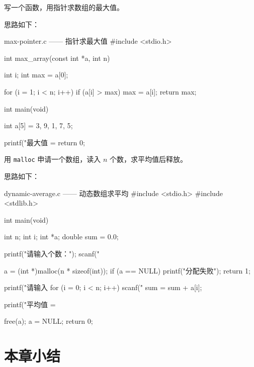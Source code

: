 \begin{example}
写一个函数，用指针求数组的最大值。
\end{example}
\begin{solution}
思路如下：

\begin{codebox}{max-pointer.c —— 指针求最大值}
#include <stdio.h>

int max_array(const int *a, int n)
{
    int i;
    int max = a[0];

    for (i = 1; i < n; i++) {
        if (a[i] > max) {
            max = a[i];
        }
    }
    return max;
}

int main(void)
{
    int a[5] = {3, 9, 1, 7, 5};

    printf("最大值 = %
    return 0;
}
\end{codebox}
\end{solution}

\begin{example}
用 \texttt{malloc} 申请一个数组，读入 $n$ 个数，求平均值后释放。
\end{example}
\begin{solution}
思路如下：

\begin{codebox}{dynamic-average.c —— 动态数组求平均}
#include <stdio.h>
#include <stdlib.h>

int main(void)
{
    int n;
    int i;
    int *a;
    double sum = 0.0;

    printf("请输入个数：");
    scanf("%

    a = (int *)malloc(n * sizeof(int));
    if (a == NULL) {
        printf("分配失败\n");
        return 1;
    }

    printf("请输入 %
    for (i = 0; i < n; i++) {
        scanf("%
        sum = sum + a[i];
    }

    printf("平均值 = %

    free(a);
    a = NULL;
    return 0;
}
\end{codebox}
\end{solution}

\section{本章小结}

